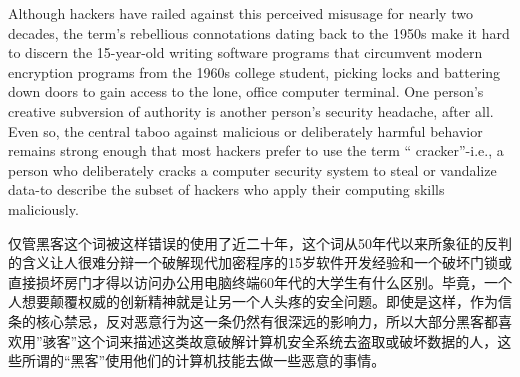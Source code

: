 \ifdefined\eng
Although hackers have railed against this perceived misusage for nearly two decades, the term's rebellious connotations dating back to the 1950s make it hard to discern the 15-year-old writing software programs that circumvent modern encryption programs from the 1960s college student, picking locks and battering down doors to gain access to the lone, office computer terminal. One person's creative subversion of authority is another person's security headache, after all. Even so, the central taboo against malicious or deliberately harmful behavior remains strong enough that most hackers prefer to use the term `` cracker''-i.e., a person who deliberately cracks a computer security system to steal or vandalize data-to describe the subset of hackers who apply their computing skills maliciously.
\fi

\ifdefined\chs
仅管黑客这个词被这样错误的使用了近二十年，这个词从50年代以来所象征的反判的含义让人很难分辩一个破解现代加密程序的15岁软件开发经验和一个破坏门锁或直接损坏房门才得以访问办公用电脑终端60年代的大学生有什么区别。毕竟，一个人想要颠覆权威的创新精神就是让另一个人头疼的安全问题。即使是这样，作为信条的核心禁忌，反对恶意行为这一条仍然有很深远的影响力，所以大部分黑客都喜欢用”骇客”这个词来描述这类故意破解计算机安全系统去盗取或破坏数据的人，这些所谓的“黑客”使用他们的计算机技能去做一些恶意的事情。
\fi





